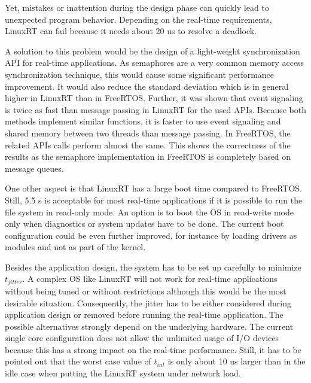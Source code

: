 Yet, mistakes or inattention during the design phase can quickly lead to unexpected program behavior.
Depending on the real-time requirements, LinuxRT can fail because it needs about 20 us to resolve a deadlock. 
\par
A solution to this problem would be the design of a light-weight synchronization \ac{API} for real-time applications.
As semaphores are a very common memory access synchronization technique, this would cause some significant performance improvement.
It would also reduce the standard deviation which is in general higher in LinuxRT than in FreeRTOS.
Further, it was shown that event signaling is twice as fast than message passing in LinuxRT for the used \acp{API}.
Because both methods implement similar functions, it is faster to use event signaling and shared memory between two threads than message passing.
In FreeRTOS, the related \acp{API} calls perform almost the same.
This shows the correctness of the results as the semaphore implementation in FreeRTOS is completely based on message queues.
\par
One other aspect is that LinuxRT has a large boot time compared to FreeRTOS. 
Still, 5.5 s is acceptable for most real-time applications if it is possible to run the file system in read-only mode.
An option is to boot the \ac{OS} in read-write mode only when diagnostics or system updates have to be done.
The current boot configuration could be even further improved, for instance by loading drivers as modules and not as part of the kernel.
\par
Besides the application design, the system has to be set up carefully to minimize $t_{jitter}$. 
A complex \ac{OS} like LinuxRT will not work for real-time applications without being tuned or without restrictions although this would be the most desirable situation.
Consequently, the jitter has to be either considered during application design or removed before running the real-time application.
The possible alternatives strongly depend on the underlying hardware.
The current single core configuration does not allow the unlimited usage of \ac{I/O} devices because this has a strong impact on the real-time performance. 
Still, it has to be pointed out that the worst case value of $t_{int}$ is only about 10 us larger than in the idle case when putting the LinuxRT system under network load. 

